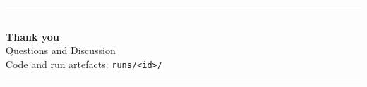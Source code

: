 \documentclass[aspectratio=169,11pt]{beamer}
\begin{document}
\begin{frame}[plain]
\vfill
\begin{center}
{\color{umorange}\rule{0.32\textwidth}{2pt}}\\[14pt]
{\LARGE\bfseries\color{umdark}Thank you}\\[10pt]
{\large\color{umgray}Questions and Discussion}\\[16pt]
{\small\color{umgray}Code and run artefacts: \texttt{runs/<id>/}}\\[14pt]
{\color{umorange}\rule{0.32\textwidth}{2pt}}
\end{center}
\vfill
\end{frame}
\end{document}
